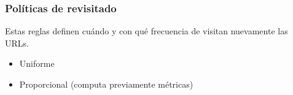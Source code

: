 \documentclass[
10pt, %
aspectratio=169, %
]{beamer}
\begin{document}
	\begin{frame}
		
		\frametitle{Políticas de revisitado}
		
		Estas reglas definen cuándo y con qué frecuencia de visitan nuevamente las URLs.
		
		\vspace{2\baselineskip}
		
		\begin{itemize}
			\item Uniforme
			
			\item Proporcional (computa previamente métricas)
		\end{itemize}
		
	\end{frame}
	
\end{document}
